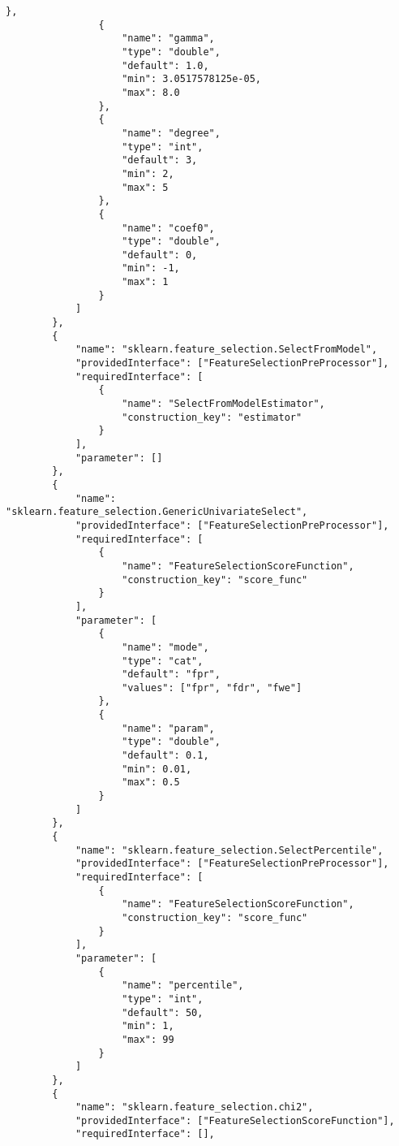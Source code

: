 \begin{Verbatim}[fontsize=\scriptsize]
                },
                {
                    "name": "gamma",
                    "type": "double",
                    "default": 1.0,
                    "min": 3.0517578125e-05,
                    "max": 8.0
                },
                {
                    "name": "degree",
                    "type": "int",
                    "default": 3,
                    "min": 2,
                    "max": 5
                },
                {
                    "name": "coef0",
                    "type": "double",
                    "default": 0,
                    "min": -1,
                    "max": 1
                }
            ]
        },
        {
            "name": "sklearn.feature_selection.SelectFromModel",
            "providedInterface": ["FeatureSelectionPreProcessor"],
            "requiredInterface": [
                {
                    "name": "SelectFromModelEstimator",
                    "construction_key": "estimator"
                }
            ],
            "parameter": []
        },
        {
            "name": "sklearn.feature_selection.GenericUnivariateSelect",
            "providedInterface": ["FeatureSelectionPreProcessor"],
            "requiredInterface": [
                {
                    "name": "FeatureSelectionScoreFunction",
                    "construction_key": "score_func"
                }
            ],
            "parameter": [
                {
                    "name": "mode",
                    "type": "cat",
                    "default": "fpr",
                    "values": ["fpr", "fdr", "fwe"]
                },
                {
                    "name": "param",
                    "type": "double",
                    "default": 0.1,
                    "min": 0.01,
                    "max": 0.5
                }
            ]
        },
        {
            "name": "sklearn.feature_selection.SelectPercentile",
            "providedInterface": ["FeatureSelectionPreProcessor"],
            "requiredInterface": [
                {
                    "name": "FeatureSelectionScoreFunction",
                    "construction_key": "score_func"
                }
            ],
            "parameter": [
                {
                    "name": "percentile",
                    "type": "int",
                    "default": 50,
                    "min": 1,
                    "max": 99
                }
            ]
        },
        {
            "name": "sklearn.feature_selection.chi2",
            "providedInterface": ["FeatureSelectionScoreFunction"],
            "requiredInterface": [],

\end{Verbatim}
